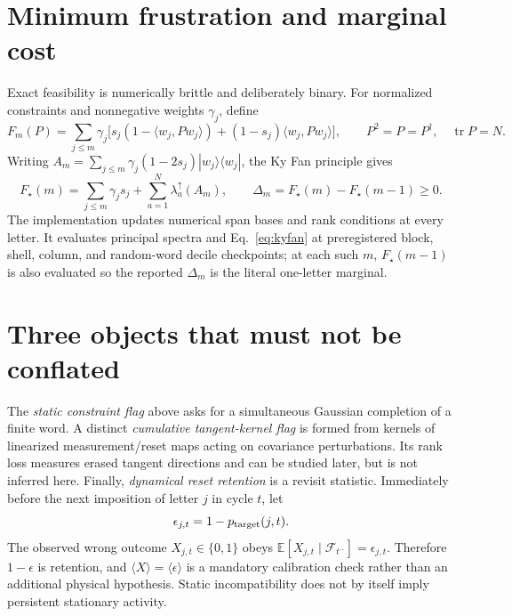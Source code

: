 \documentclass[aps,prb,onecolumn,nofootinbib,superscriptaddress]{revtex4-2}
\newcommand{\tr}{\operatorname{tr}}
\begin{document}
\section{Minimum frustration and marginal cost}

Exact feasibility is numerically brittle and deliberately binary.  For normalized
constraints and nonnegative weights $\gamma_j$, define
\begin{equation}
 F_m(P)=\sum_{j\le m}\gamma_j\big[s_j(1-\langle w_j,Pw_j\rangle)
 +(1-s_j)\langle w_j,Pw_j\rangle\big],\qquad P^2=P=P^\dagger,
\quad\tr P=N.
\end{equation}
Writing
$A_m=\sum_{j\le m}\gamma_j(1-2s_j)|w_j\rangle\langle w_j|$, the Ky Fan principle gives
\begin{equation}
 F_\star(m)=\sum_{j\le m}\gamma_js_j+\sum_{a=1}^{N}\lambda_a^\uparrow(A_m),
 \qquad \Delta_m=F_\star(m)-F_\star(m-1)\ge0.
 \label{eq:kyfan}
\end{equation}
The implementation updates numerical span bases and rank conditions at every letter.
It evaluates principal spectra and Eq.~\eqref{eq:kyfan} at preregistered block, shell,
column, and random-word decile checkpoints; at each such $m$, $F_\star(m-1)$ is also
evaluated so the reported $\Delta_m$ is the literal one-letter marginal.

\section{Three objects that must not be conflated}

The \emph{static constraint flag} above asks for a simultaneous Gaussian completion of
a finite word.  A distinct \emph{cumulative tangent-kernel flag} is formed from kernels
of linearized measurement/reset maps acting on covariance perturbations.  Its rank loss
measures erased tangent directions and can be studied later, but is not inferred here.
Finally, \emph{dynamical reset retention} is a revisit statistic.  Immediately before
the next imposition of letter $j$ in cycle $t$, let
\begin{equation}
 \epsilon_{j,t}=1-p_{\rm target}(j,t).
\end{equation}
The observed wrong outcome $X_{j,t}\in\{0,1\}$ obeys
$\mathbb E[X_{j,t}\mid\mathcal F_{t^-}]=\epsilon_{j,t}$.  Therefore
$1-\epsilon$ is retention, and $\langle X\rangle=\langle\epsilon\rangle$ is a mandatory
calibration check rather than an additional physical hypothesis.  Static
incompatibility does not by itself imply persistent stationary activity.
\end{document}
